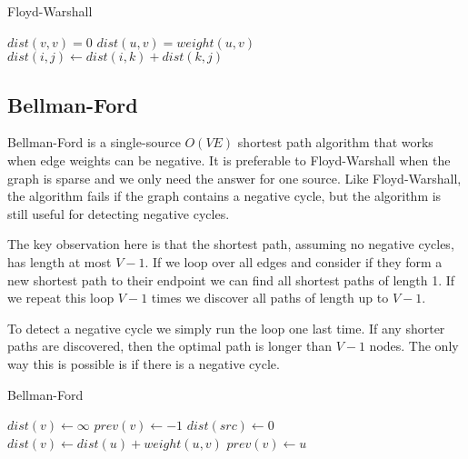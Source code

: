 \documentclass{article}
\begin{document}
\begin{algorithm}[H]
\caption{Floyd-Warshall}
\begin{algorithmic}
	\State $dist(v,v)=0$
\EndFor
{}
	\State $dist(u,v)=weight(u,v)$
\EndFor
{}
            	\State $dist(i,j) \gets dist(i,k)+dist(k,j)$
            \EndIf
        \EndFor
    \EndFor
\EndFor
\end{algorithmic}
\end{algorithm}

\subsection{Bellman-Ford}

Bellman-Ford is a single-source $O(VE)$ shortest path algorithm that works when edge weights can be negative. It is preferable to Floyd-Warshall when the graph is sparse and we only need the answer for one source. Like Floyd-Warshall, the algorithm fails if the graph contains a negative cycle, but the algorithm is still useful for detecting negative cycles.

The key observation here is that the shortest path, assuming no negative cycles, has length at most $V-1$.  If we loop over all edges and consider if they form a new shortest path to their endpoint we can find all shortest paths of length 1.  If we repeat this loop $V-1$ times we discover all paths of length up to $V-1$.

To detect a negative cycle we simply run the loop one last time.  If any shorter paths are discovered, then the optimal path is longer than $V-1$ nodes.  The only way this is possible is if there is a negative cycle.


\begin{algorithm}[H]
\caption{Bellman-Ford}
\begin{algorithmic}
	\State $dist(v)\gets\infty$
    \State $prev(v)\gets -1$
\EndFor
\State $dist(src) \gets 0$
    	    \State $dist(v) \gets dist(u)+weight(u,v)$
	        \State $prev(v) \gets u$
        \EndIf
	\EndFor
\EndFor
{}
	\EndIf
\EndFor
\end{algorithmic}
\end{algorithm}
\end{document}
